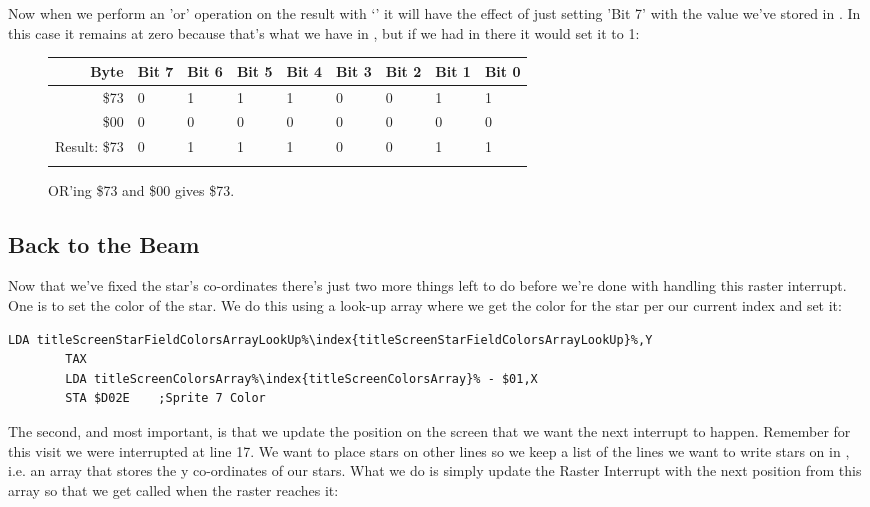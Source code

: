 Now when we perform an 'or' operation on the result with `' it will have the effect of just setting 'Bit 7'
with the value we've stored in . In this case it remains at zero because that's what we have in
, but if we had  in there it would set it to 1: 

\begin{figure}[H]
  {
    \setlength{\tabcolsep}{3.0pt}
    \setlength\cmidrulewidth{\heavyrulewidth} %
    \begin{adjustbox}{width=10cm,center}

      \begin{tabular}{rllllllll}
        \toprule
        Byte & Bit 7 & Bit 6 & Bit 5 & Bit 4 & Bit 3 & Bit 2 & Bit 1 & Bit 0        \\
        \midrule
        \$73 & 0 & 1 & 1 & 1 & 0 & 0 & 1 & 1 \\
        \$00 & 0 & 0 & 0 & 0 & 0 & 0 & 0 & 0 \\
        \midrule
        Result: \$73 & 0 & 1 & 1 & 1 & 0 & 0 & 1 & 1 \\
        \addlinespace
        \bottomrule
      \end{tabular}
    \end{adjustbox}
  }\caption*{OR'ing \$73 and \$00 gives \$73.}
\end{figure}

\subsection{Back to the Beam}
Now that we've fixed the star's co-ordinates there's just two more things left to do before we're done with
handling this raster interrupt. One is to set the color of the star. We do this using a look-up array
where we get the color for the star per our current index and set it:

\begin{lstlisting}[escapechar=\%]
        LDA titleScreenStarFieldColorsArrayLookUp%\index{titleScreenStarFieldColorsArrayLookUp}%,Y
        TAX
        LDA titleScreenColorsArray%\index{titleScreenColorsArray}% - $01,X
        STA $D02E    ;Sprite 7 Color
\end{lstlisting}

The second, and most important, is that we update the position on the screen that we want the next interrupt to
happen. Remember for this visit we were interrupted at line 17. We want to place stars on other lines so we keep
a list of the lines we want to write stars on in , i.e. an array that
stores the y co-ordinates of our stars. What we do is simply update the Raster Interrupt with the next position
from this array so that we get called when the raster reaches it:


